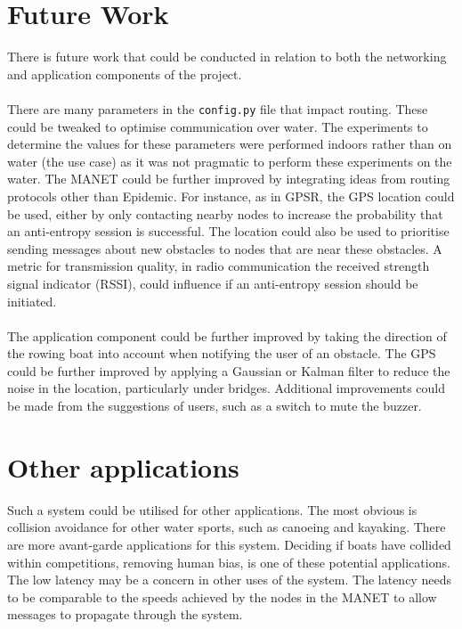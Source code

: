 \documentclass[12pt,a4paper]{report}
\begin{document}
{\section{Future Work}
There is future work that could be conducted in relation to both the networking and application components of the project. \\ \\
There are many parameters in the \verb'config.py' file that impact routing. These could be tweaked to optimise communication over water. The experiments to determine the values for these parameters were performed indoors rather than on water (the use case) as it was not pragmatic to perform these experiments on the water.
The MANET could be further improved by integrating ideas from routing protocols other than Epidemic. For instance, as in GPSR, the GPS location could be used, either by only contacting nearby nodes to increase the probability that an anti-entropy session is successful. The location could also be used to prioritise sending messages about new obstacles to nodes that are near these obstacles.  A metric for transmission quality, in radio communication the received strength signal indicator (RSSI), could influence if an anti-entropy session should be initiated. \\ \\ 
The application component could be further improved by taking the direction of the rowing boat into account when notifying the user of an obstacle. The GPS could be further improved by applying a Gaussian or Kalman filter to reduce the noise in the location, particularly under bridges. Additional improvements could be made from the suggestions of users, such as a switch to mute the buzzer. \\

\section{Other applications}
Such a system could be utilised for other applications. The most obvious is collision avoidance for other water sports, such as canoeing and kayaking. There are more avant-garde applications for this system. Deciding if boats have collided within competitions, removing human bias, is one of these potential applications. The low latency may be a concern in other uses of the system. The latency needs to be comparable to the speeds achieved by the nodes in the MANET to allow messages to propagate through the system.





}
\end{document}

